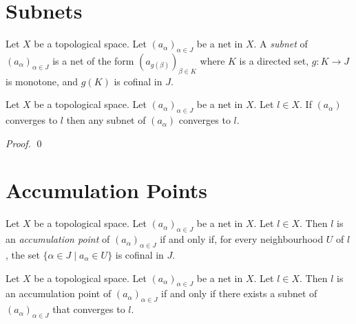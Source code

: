 \section{Subnets}

\begin{definition}[Subnet]
    Let $X$ be a topological space. Let $(a_\alpha)_{\alpha \in J}$ be a net
    in $X$. A \emph{subnet} of $(a_\alpha)_{\alpha \in J}$ is a net of the form
    $(a_{g(\beta)})_{\beta \in K}$ where $K$ is a directed set, $g : K \rightarrow J$
    is monotone, and $g(K)$ is cofinal in $J$.
\end{definition}

\begin{proposition}
    Let $X$ be a topological space. Let $(a_\alpha)_{\alpha \in J}$ be a net
    in $X$. Let $l \in X$. If $(a_\alpha)$ converges to $l$ then any subnet
    of $(a_\alpha)$ converges to $l$.
\end{proposition}

\begin{proof}
    \pf
    \qed
\end{proof}

\section{Accumulation Points}

\begin{definition}
    Let $X$ be a topological space. Let $(a_\alpha)_{\alpha \in J}$ be a net
    in $X$. Let $l \in X$. Then $l$ is an \emph{accumulation point} of
    $(a_\alpha)_{\alpha \in J}$ if and only if, for every neighbourhood $U$
    of $l$, the set $\{ \alpha \in J \mid a_\alpha \in U \}$ is cofinal in $J$.
\end{definition}

\begin{lemma}
    \label{lemma:accumulation_point_subnet}
    Let $X$ be a topological space. Let $(a_\alpha)_{\alpha \in J}$ be a net
    in $X$. Let $l \in X$. Then $l$ is an accumulation point of
    $(a_\alpha)_{\alpha \in J}$ if and only if there exists a subnet of
    $(a_\alpha)_{\alpha \in J}$ that converges to $l$.
\end{lemma}

